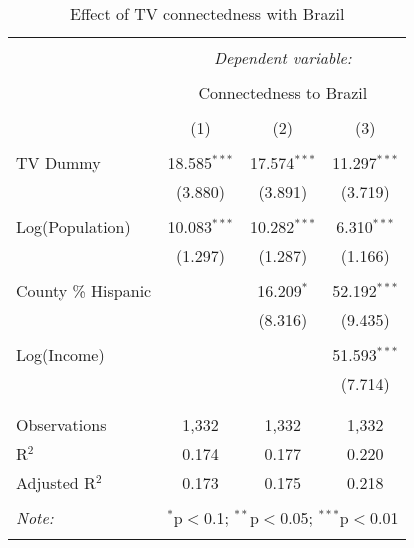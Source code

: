 
\begin{table}[!htbp] \centering 
  \caption{Effect of TV connectedness with Brazil} 
  \label{} 
\begin{tabular}{@{\extracolsep{-5pt}}lccc} 
\\[-1.8ex]\hline 
\hline \\[-1.8ex] 
 & \multicolumn{3}{c}{\textit{Dependent variable:}} \\ 
\cline{2-4} 
\\[-1.8ex] & \multicolumn{3}{c}{Connectedness to Brazil} \\ 
\\[-1.8ex] & (1) & (2) & (3)\\ 
\hline \\[-1.8ex] 
 TV Dummy & 18.585$^{***}$ & 17.574$^{***}$ & 11.297$^{***}$ \\ 
  & (3.880) & (3.891) & (3.719) \\ 
  & & & \\ 
 Log(Population) & 10.083$^{***}$ & 10.282$^{***}$ & 6.310$^{***}$ \\ 
  & (1.297) & (1.287) & (1.166) \\ 
  & & & \\ 
 County \% Hispanic &  & 16.209$^{*}$ & 52.192$^{***}$ \\ 
  &  & (8.316) & (9.435) \\ 
  & & & \\ 
 Log(Income) &  &  & 51.593$^{***}$ \\ 
  &  &  & (7.714) \\ 
  & & & \\ 
\hline \\[-1.8ex] 
Observations & 1,332 & 1,332 & 1,332 \\ 
R$^{2}$ & 0.174 & 0.177 & 0.220 \\ 
Adjusted R$^{2}$ & 0.173 & 0.175 & 0.218 \\ 
\hline 
\hline \\[-1.8ex] 
\textit{Note:}  & \multicolumn{3}{r}{$^{*}$p$<$0.1; $^{**}$p$<$0.05; $^{***}$p$<$0.01} \\ 
 & \multicolumn{3}{r}{} \\ 
\end{tabular} 
\end{table} 
